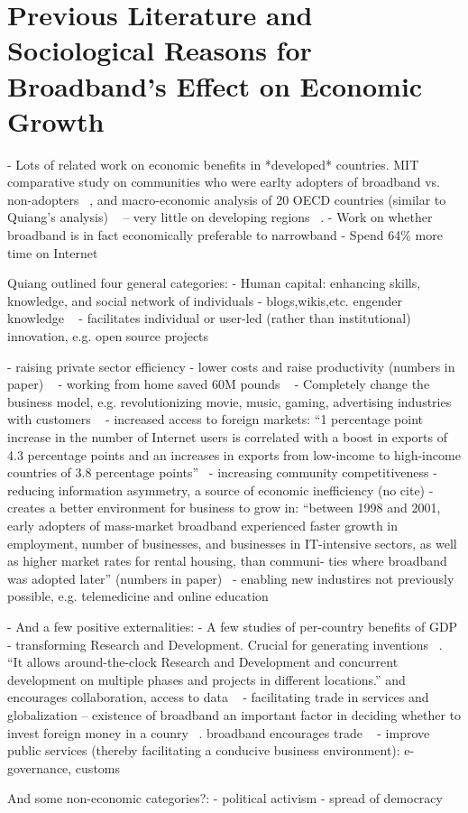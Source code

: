 \section{Previous Literature and Sociological Reasons for Broadband's Effect on Economic Growth}
\label{sec:sociology}

- Lots of related work on economic benefits in *developed* countries. MIT comparative study on communities who were earlty adopters of broadband vs. non-adopters ~\cite{gillett2006measuring}, and macro-economic analysis of 20 OECD countries (similar to Quiang’s analysis) ~\cite{koutroumpis2009economic} -- very little on developing regions ~\cite{Quiang}.
- Work on whether broadband is in fact economically preferable to narrowband
    - Spend 64\% more time on Internet ~\cite{saksena2003igniting}


 Quiang outlined four general categories: 
   - Human capital: enhancing skills, knowledge, and social network of individuals
       - blogs,wikis,etc. engender knowledge ~\cite{johnson2005next}
       - facilitates individual or user-led (rather than institutional) innovation, e.g. open source projects ~\cite{von2009democratizing}

   - raising private sector efficiency
       - lower costs and raise productivity (numbers in paper) ~\cite{varian2002net}
       - working from home saved 60M pounds ~\cite{bband_stakeholder}
       - Completely change the business model, e.g. revolutionizing movie, music, gaming, advertising industries with customers ~\cite{heng2006media}
       - increased access to foreign markets: ``1 percentage point increase in
       the number of Internet users is correlated with a boost in exports of
       4.3 percentage points and an increases in exports from low-income to
       high-income countries of 3.8 percentage points''~\cite{clarke2004has}
   - increasing community competitiveness
        - reducing information asymmetry, a source of economic inefficiency (no cite)
        - creates a better environment for business to grow in: ``between 1998
        and 2001, early adopters of mass-market broadband experienced faster
        growth in employment, number of businesses, and businesses in
        IT-intensive sectors, as well as higher market rates for rental
        housing, than communi- ties where broadband was adopted later'' (numbers in paper)~\cite{gillett2006measuring}
          - enabling new industires not previously possible, e.g. telemedicine and online education
 
- And a few positive externalities:
   - A few studies of per-country benefits of GDP 
   - transforming Research and Development. Crucial for generating inventions ~\cite{carlaw2007past}. 
``It allows around-the-clock Research and Development and concurrent
development on multiple phases and projects in different locations.'' and encourages collaboration, access to data ~\cite{van2008broadband}
   - facilitating trade in services and globalization -- existence of broadband an important factor in deciding whether to invest foreign money in a counry ~\cite{abramovsky2006outsourcing}. broadband encourages trade ~\cite{attendusing}
   - improve public services (thereby facilitating a conducive business environment): e-governance, customs ~\cite{de2004customs}

And some non-economic categories?:
   - political activism
   - spread of democracy

